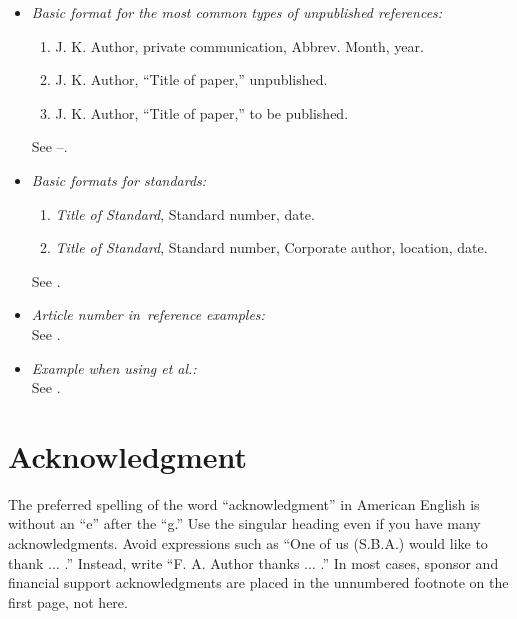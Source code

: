\documentclass{ieeeaccess}
\begin{document}
\begin{itemize}
\item \emph{Basic format for the most common types of unpublished references:}
\begin{enumerate}
\item J. K. Author, private communication, Abbrev. Month, year.
\item J. K. Author, ``Title of paper,'' unpublished.
\item J. K. Author, ``Title of paper,'' to be published.
\end{enumerate}
See \cite{b27}--\cite{b29}.

\item \emph{Basic formats for standards:}
\begin{enumerate}
\item \emph{Title of Standard}, Standard number, date.
\item \emph{Title of Standard}, Standard number, Corporate author, location, date.
\end{enumerate}
See \cite{b30,b31}.

\item \emph{Article number in~reference examples:}\\
See \cite{b32,b33}.

\item \emph{Example when using et al.:}\\
See \cite{b34}.

\end{itemize}


\section*{Acknowledgment}
The preferred spelling of the word ``acknowledgment'' in American English is
without an ``e'' after the ``g.'' Use the singular heading even if you have
many acknowledgments. Avoid expressions such as ``One of us (S.B.A.) would
like to thank $\ldots$ .'' Instead, write ``F. A. Author thanks $\ldots$ .'' In most
cases, sponsor and financial support acknowledgments are placed in the
unnumbered footnote on the first page, not here.
\end{document}
